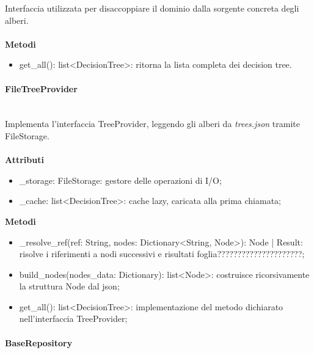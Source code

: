 \documentclass[a4paper,12pt]{article}
\begin{document}
                    Interfaccia utilizzata per disaccoppiare il dominio dalla sorgente concreta degli alberi.\\\\
                    \textbf{Metodi}
                    \begin{itemize}
                        \item {\ttfamily get\_all(): list<DecisionTree>}: ritorna la lista completa dei decision tree.
                    \end{itemize}
                
                \paragraph{FileTreeProvider}\mbox{}\\
                    Implementa l'interfaccia TreeProvider, leggendo gli alberi da \textit{trees.json} tramite FileStorage.\\\\
                    \textbf{Attributi}
                        \begin{itemize}
                            \item {\ttfamily \_storage: FileStorage}: gestore delle operazioni di I/O;
                            \item {\ttfamily \_cache: list<DecisionTree>}: cache lazy, caricata alla prima chiamata;
                        \end{itemize}
                    \textbf{Metodi}
                    \begin{itemize}
                        \item {\ttfamily \_resolve\_ref(ref: String, nodes: Dictionary<String, Node>): Node | Result}: risolve i riferimenti a nodi successivi e risultati foglia?????????????????????;
                        \item {\ttfamily build\_nodes(nodes\_data: Dictionary): list<Node>}: costruisce ricorsivamente la struttura Node dal json;
                        \item {\ttfamily get\_all(): list<DecisionTree>}: implementazione del metodo dichiarato nell'interfaccia TreeProvider;
                    \end{itemize}

                \paragraph{BaseRepository}
\end{document}
